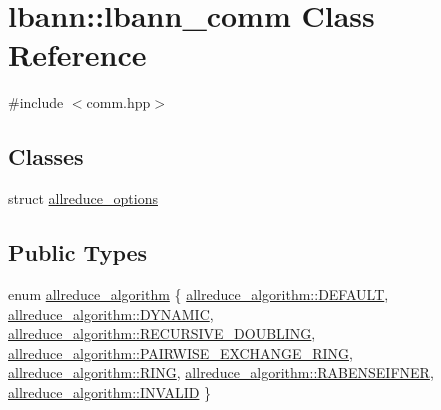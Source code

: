 \hypertarget{classlbann_1_1lbann__comm}{}\section{lbann\+:\+:lbann\+\_\+comm Class Reference}
\label{classlbann_1_1lbann__comm}


{\ttfamily \#include $<$comm.\+hpp$>$}

\subsection*{Classes}
\begin{DoxyCompactItemize}
\item 
struct \hyperlink{structlbann_1_1lbann__comm_1_1allreduce__options}{allreduce\+\_\+options}
\end{DoxyCompactItemize}
\subsection*{Public Types}
\begin{DoxyCompactItemize}
\item 
enum \hyperlink{classlbann_1_1lbann__comm_a02a03227cc27e3516f0d9f9812f32019}{allreduce\+\_\+algorithm} \{ \newline
\hyperlink{classlbann_1_1lbann__comm_a02a03227cc27e3516f0d9f9812f32019a5b39c8b553c821e7cddc6da64b5bd2ee}{allreduce\+\_\+algorithm\+::\+D\+E\+F\+A\+U\+LT}, 
\hyperlink{classlbann_1_1lbann__comm_a02a03227cc27e3516f0d9f9812f32019a0fcc90da4811c877ba9f9c12f7d60bc9}{allreduce\+\_\+algorithm\+::\+D\+Y\+N\+A\+M\+IC}, 
\hyperlink{classlbann_1_1lbann__comm_a02a03227cc27e3516f0d9f9812f32019a5a99a7b378e450d9e91b10b1f0085274}{allreduce\+\_\+algorithm\+::\+R\+E\+C\+U\+R\+S\+I\+V\+E\+\_\+\+D\+O\+U\+B\+L\+I\+NG}, 
\hyperlink{classlbann_1_1lbann__comm_a02a03227cc27e3516f0d9f9812f32019ae97d669b6498b36d1ce07b3d2c544fee}{allreduce\+\_\+algorithm\+::\+P\+A\+I\+R\+W\+I\+S\+E\+\_\+\+E\+X\+C\+H\+A\+N\+G\+E\+\_\+\+R\+I\+NG}, 
\newline
\hyperlink{classlbann_1_1lbann__comm_a02a03227cc27e3516f0d9f9812f32019ae69b8a2544417fb71e2767e95d7ac8f3}{allreduce\+\_\+algorithm\+::\+R\+I\+NG}, 
\hyperlink{classlbann_1_1lbann__comm_a02a03227cc27e3516f0d9f9812f32019aecfb3869b05d9c2103f98c386a9e8a41}{allreduce\+\_\+algorithm\+::\+R\+A\+B\+E\+N\+S\+E\+I\+F\+N\+ER}, 
\hyperlink{classlbann_1_1lbann__comm_a02a03227cc27e3516f0d9f9812f32019accc0377a8afbf50e7094f5c23a8af223}{allreduce\+\_\+algorithm\+::\+I\+N\+V\+A\+L\+ID}
 \}
\end{DoxyCompactItemize}
